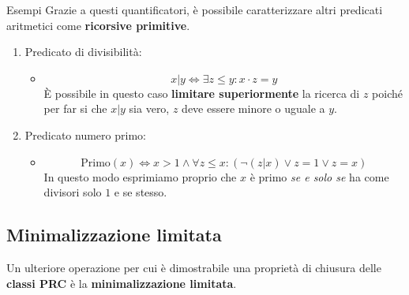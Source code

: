 \begin{generalbox}[colframe=azure-gradient-3!90!black]{Esempi}
  Grazie a questi quantificatori, è possibile caratterizzare altri predicati aritmetici come \textbf{ricorsive primitive}.
  \begin{enumerate}
    \item Predicato di divisibilità:
    \begin{itemize}
      \item [] \begin{equation}
        x|y \iff \exists z \leq y: x\cdot z = y
      \end{equation}
      È possibile in questo caso \textbf{limitare superiormente} la ricerca di \(z\) poiché per far si che \(x|y\) sia vero, \(z\) deve essere minore o uguale a \(y\).
    \end{itemize}
    \item Predicato numero primo:
    \begin{itemize}
      \item [] \begin{equation}
        \text{Primo}(x) \iff x>1 \land \forall z \leq x: (\neg(z|x) \lor z=1 \lor z=x)
      \end{equation}
      In questo modo esprimiamo proprio che \(x\) è primo \textit{se e solo se} ha come divisori solo \(1\) e se stesso.
      \end{itemize}
  \end{enumerate}
\end{generalbox}

\subsection{Minimalizzazione limitata}
Un ulteriore operazione per cui è dimostrabile una proprietà di chiusura delle \textbf{classi PRC} è la \textbf{minimalizzazione limitata}.

